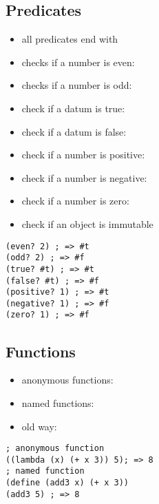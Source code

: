 \documentclass[a4paper,landscape,10pt]{article}
\begin{document}
\begin{multicols*}{2}
  \subsection{Predicates}

  \begin{itemize}
    \item all predicates end with 
    \item checks if a number is even: 
    \item checks if a number is odd: 
    \item check if a datum is true: 
    \item check if a datum is false: 
    \item check if a number is positive: 
    \item check if a number is negative: 
    \item check if a number is zero: 
    \item check if an object is immutable 
  \end{itemize}

  \begin{lstlisting}[language=Racket]
(even? 2) ; => #t
(odd? 2) ; => #f
(true? #t) ; => #t
(false? #t) ; => #f
(positive? 1) ; => #t
(negative? 1) ; => #f
(zero? 1) ; => #f
\end{lstlisting}

  \breakcolumn

  \subsection{Functions}

  \begin{itemize}
    \item anonymous functions: 
    \item named functions: 
    \item old way: 
  \end{itemize}

  \begin{lstlisting}[language=Racket]
; anonymous function
((lambda (x) (+ x 3)) 5); => 8
; named function
(define (add3 x) (+ x 3))
(add3 5) ; => 8
\end{lstlisting}


\end{multicols*}
\end{document}
